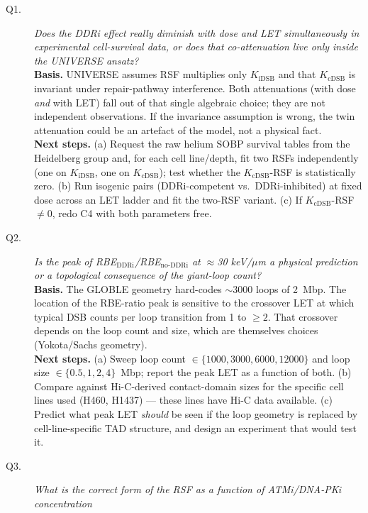 \documentclass[11pt]{article}
\begin{document}
\begin{description}
  \item[Q1.] \emph{Does the DDRi effect really diminish with dose and LET simultaneously in
        experimental cell-survival data, or does that co-attenuation live only inside the
        UNIVERSE ansatz?}\\
        \textbf{Basis.} UNIVERSE assumes RSF multiplies only $K_{\mathrm{iDSB}}$ and that
        $K_{\mathrm{cDSB}}$ is invariant under repair-pathway interference. Both attenuations (with
        dose \emph{and} with LET) fall out of that single algebraic choice; they are not
        independent observations. If the invariance assumption is wrong, the twin attenuation
        could be an artefact of the model, not a physical fact.\\
        \textbf{Next steps.} (a) Request the raw helium SOBP survival tables from the Heidelberg
        group and, for each cell line/depth, fit two RSFs independently (one on $K_{\mathrm{iDSB}}$,
        one on $K_{\mathrm{cDSB}}$); test whether the $K_{\mathrm{cDSB}}$-RSF is statistically zero.
        (b) Run isogenic pairs (DDRi-competent vs.\ DDRi-inhibited) at fixed dose across an LET
        ladder and fit the two-RSF variant. (c) If $K_{\mathrm{cDSB}}$-RSF $\neq 0$, redo C4 with
        both parameters free.
  \item[Q2.] \emph{Is the peak of RBE$_{\text{DDRi}}$/RBE$_{\text{no-DDRi}}$ at $\approx$30
        keV/$\mu$m a physical prediction or a topological consequence of the giant-loop count?}\\
        \textbf{Basis.} The GLOBLE geometry hard-codes $\sim$3000 loops of 2~Mbp. The location of
        the RBE-ratio peak is sensitive to the crossover LET at which typical DSB counts per loop
        transition from 1 to $\geq 2$. That crossover depends on the loop count and size, which
        are themselves choices (Yokota/Sachs geometry).\\
        \textbf{Next steps.} (a) Sweep loop count $\in \{1000, 3000, 6000, 12000\}$ and loop size
        $\in \{0.5, 1, 2, 4\}$~Mbp; report the peak LET as a function of both. (b) Compare against
        Hi-C-derived contact-domain sizes for the specific cell lines used (H460, H1437) --- these
        lines have Hi-C data available. (c) Predict what peak LET \emph{should} be seen if the
        loop geometry is replaced by cell-line-specific TAD structure, and design an experiment
        that would test it.
  \item[Q3.] \emph{What is the correct form of the RSF as a function of ATMi/DNA-PKi concentration
}
\end{description}
\end{document}
